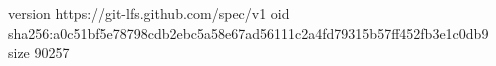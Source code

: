 version https://git-lfs.github.com/spec/v1
oid sha256:a0c51bf5e78798cdb2ebc5a58e67ad56111c2a4fd79315b57ff452fb3e1c0db9
size 90257

